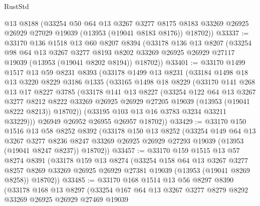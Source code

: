 \begin{lexlean}{RustStd}
\begin{coremodule}
      @13
      @8188
      (@33254
        @50
        @64
        @13
        @3267
        @3277
        @8175
        @8183
        @33269
        @26925
        @26929
        @27029
        @19039
        (@13953 (@19041 @8183 @8176))
        @18702))
@33337 := @33170
    @136
    @1518
    @13
    @60
    @8207
    @8394
    (@33178
      @136
      @13
      @8207
      (@33254
        @98
        @64
        @13
        @3267
        @3277
        @8193
        @8202
        @33269
        @26925
        @26929
        @27117
        @19039
        (@13953 (@19041 @8202 @8194))
        @18702))
@33401 := @33170
    @1499
    @1517
    @13
    @59
    @8231
    @8393
    (@33178
      @1499
      @13
      @8231
      (@33184
        @1498
        @18
        @13
        @3220
        @8229
        @3186
        @1335
        (@33165
          @1498
          @18
          @8229
          (@33170
            @141
            @268
            @13
            @17
            @8227
            @3785
            (@33178
              @141
              @13
              @8227
              (@33254
                @122
                @64
                @13
                @3267
                @3277
                @8212
                @8222
                @33269
                @26925
                @26929
                @27205
                @19039
                (@13953 (@19041 @8222 @8213))
                @18702))
            (@33195 @103 @13 @16 @3783 @3234 @33211 @33229)))
        @26949
        @26952
        @26955
        @26957
        @18702))
@33429 := @33170
    @150
    @1516
    @13
    @58
    @8252
    @8392
    (@33178
      @150
      @13
      @8252
      (@33254
        @149
        @64
        @13
        @3267
        @3277
        @8236
        @8247
        @33269
        @26925
        @26929
        @27293
        @19039
        (@13953 (@19041 @8247 @8237))
        @18702))
@33457 := @33170
    @159
    @1515
    @13
    @57
    @8274
    @8391
    (@33178
      @159
      @13
      @8274
      (@33254
        @158
        @64
        @13
        @3267
        @3277
        @8257
        @8269
        @33269
        @26925
        @26929
        @27381
        @19039
        (@13953 (@19041 @8269 @8258))
        @18702))
@33485 := @33170
    @168
    @1514
    @13
    @56
    @8297
    @8390
    (@33178
      @168
      @13
      @8297
      (@33254
        @167
        @64
        @13
        @3267
        @3277
        @8279
        @8292
        @33269
        @26925
        @26929
        @27469
        @19039

\end{coremodule}
\end{lexlean}
